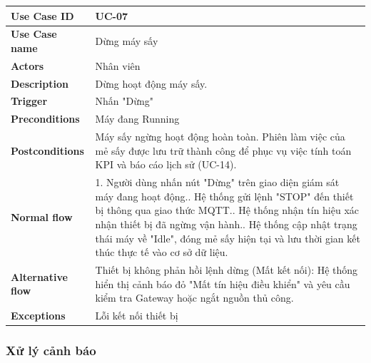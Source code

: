 \begin{tabular}{|p{3.5cm}|p{9.5cm}|}
\hline
\textbf{Use Case ID} & UC-07 \\
\hline
\textbf{Use Case name} & Dừng máy sấy \\
\hline
\textbf{Actors} & Nhân viên \\
\hline
\textbf{Description} & 
Dừng hoạt động máy sấy. \\
\hline
\textbf{Trigger} & Nhấn "Dừng" \\
\hline
\textbf{Preconditions} & Máy đang Running \\
\hline
\textbf{Postconditions} & Máy sấy ngừng hoạt động hoàn toàn. Phiên làm việc của mẻ sấy được lưu trữ thành công để phục vụ việc tính toán KPI và báo cáo lịch sử (UC-14). \\
\hline
\textbf{Normal flow} & 
1. Người dùng nhấn nút "Dừng" trên giao diện giám sát máy đang hoạt động.\newline
2. Hệ thống gửi lệnh "STOP" đến thiết bị thông qua giao thức MQTT.\newline
3. Hệ thống nhận tín hiệu xác nhận thiết bị đã ngừng vận hành.\newline
4. Hệ thống cập nhật trạng thái máy về "Idle", đóng mẻ sấy hiện tại và lưu thời gian kết thúc thực tế vào cơ sở dữ liệu.\\
\hline
\textbf{Alternative flow} & 
Thiết bị không phản hồi lệnh dừng (Mất kết nối): Hệ thống hiển thị cảnh báo đỏ "Mất tín hiệu điều khiển" và yêu cầu kiểm tra Gateway hoặc ngắt nguồn thủ công. \\
\hline
\textbf{Exceptions} & Lỗi kết nối thiết bị \\
\hline
\end{tabular}


\subsubsection{Xử lý cảnh báo }

